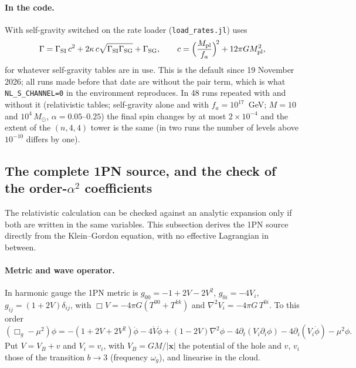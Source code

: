 \documentclass[11pt]{article}
\newcommand{\bx}{\mathbf{x}}\newcommand{\by}{\mathbf{y}}
\newcommand{\Mpl}{M_{\rm pl}}
\begin{document}
\paragraph{In the code.} With self-gravity switched on the rate loader (\texttt{load\_rates.jl}) uses
\begin{equation}
\Gamma=\Gamma_{\rm SI}\,c^2+2\kappa\,c\sqrt{\Gamma_{\rm SI}\Gamma_{\rm SG}}+\Gamma_{\rm SG},\qquad c=\Big(\frac{\Mpl}{f_a}\Big)^{\!2}+12\pi G\Mpl^2,
\end{equation}
for whatever self-gravity tables are in use. This is the default since 19 November 2026; all runs made before that date are
without the pair term, which is what \texttt{NL\_S\_CHANNEL=0} in the environment reproduces. In 48 runs repeated with and
without it (relativistic tables; self-gravity alone and with $f_a=10^{17}$~GeV; $M=10$ and $10^4\,M_\odot$, $\alpha=0.05$--$0.25$) the
final spin changes by at most $2\times10^{-4}$ and the extent of the $(n,4,4)$ tower is the same (in two runs the number of
levels above $10^{-10}$ differs by one).


\subsection{The complete 1PN source, and the check of the order-$\alpha^2$ coefficients}\label{sec:kg1pn}
The relativistic calculation can be checked against an analytic expansion only if both are written in the same variables. This
subsection derives the 1PN source directly from the Klein--Gordon equation, with no effective Lagrangian in between.

\paragraph{Metric and wave operator.} In harmonic gauge the 1PN metric is
$g_{00}=-1+2V-2V^2$, $g_{0i}=-4V_i$, $g_{ij}=(1+2V)\delta_{ij}$, with $\Box V=-4\pi G(T^{00}+T^{kk})$ and $\nabla^2V_i=-4\pi G\,T^{0i}$.
To this order
\begin{equation}
(\Box_g-\mu^2)\phi=-(1+2V+2V^2)\ddot\phi-4\dot V\dot\phi+(1-2V)\nabla^2\phi-4\partial_t(V_i\partial_i\phi)-4\partial_i(V_i\dot\phi)-\mu^2\phi .
\end{equation}
Put $V=V_B+v$ and $V_i=v_i$, with $V_B=GM/|\bx|$ the potential of the hole and $v$, $v_i$ those of the transition $b\to3$
(frequency $\omega_g$), and linearise in the cloud.
\end{document}
